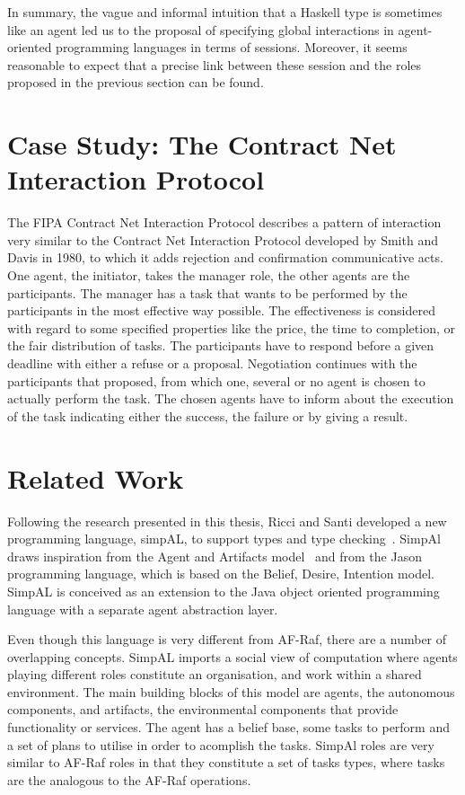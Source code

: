 \documentclass[a4paper,12pt,oneside,fleqn]{book} %
\theoremstyle{plain}
\theoremstyle{definition}
\theoremstyle{remark}
\begin{document}
In summary, the vague and informal intuition that a Haskell type is
sometimes like an agent led us to the proposal of specifying global
interactions in agent-oriented programming languages in terms of sessions.
Moreover, it seems reasonable to expect that a precise link between these
session and the roles proposed in the previous section can be found.


\chapter{Case Study: The Contract Net Interaction Protocol} %

The FIPA Contract Net Interaction Protocol\cite{} describes a pattern of
interaction very similar to the Contract Net Interaction Protocol\cite{}
developed by Smith and Davis in 1980, to which it adds rejection and
confirmation communicative acts. One agent, the initiator, takes the
manager role, the other agents are the participants. The manager has a task
that wants to be performed by the participants in the most effective way
possible. The effectiveness is considered with regard to some specified
properties like the price, the time to completion, or the fair distribution
of tasks. The participants have to respond before a given deadline with
either a refuse or a proposal. Negotiation continues with the participants
that proposed, from which one, several or no agent is chosen to actually
perform the task. The chosen agents have to inform about the execution of
the task indicating either the success, the failure or by giving a result.

\chapter{Related Work} %


Following the research presented in this thesis, Ricci  and Santi developed
a new programming language, simpAL, to support types and type
checking~\cite{}. SimpAl draws inspiration from the Agent and Artifacts
model~\cite{} and from the Jason programming language, which is based on
the Belief, Desire, Intention model. SimpAL is conceived as an extension to
the Java object oriented programming language with a separate agent
abstraction layer. 

Even though this language is very different from AF-Raf, there are a
number of overlapping concepts. SimpAL imports a social view of computation
where agents playing different roles constitute an organisation, and work
within a shared environment. The main building blocks of this model are
agents, the autonomous components, and artifacts, the environmental
components that provide functionality or services. The agent has a belief
base, some tasks to perform and a set of plans to utilise in order to
acomplish the tasks. SimpAl roles are very similar to AF-Raf roles in that
they constitute a set of tasks types, where tasks are the analogous to the
AF-Raf operations. 
\end{document}
